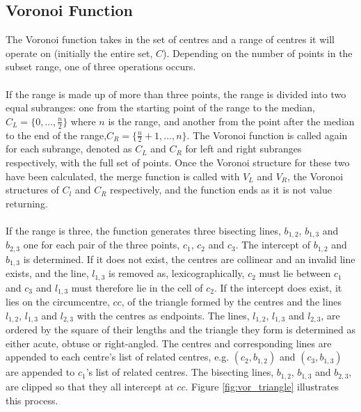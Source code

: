 \subsection{Voronoi Function}
The Voronoi function takes in the set of centres and a range of centres it will operate on (initially the entire set, $C$). Depending on the number of points in the subset range, one of three operations occurs.
\\
\\
If the range is made up of more than three points, the range is divided into two equal subranges: one from the starting point of the range to the median, $C_L = \{0,...,\frac{n}{2}\}$ where $n$ is the range, and another from the point after the median to the end of the range,$C_R = \{\frac{n}{2}+1,...,n\}$. The Voronoi function is called again for each subrange, denoted as $C_L$ and $C_R$ for left and right subranges respectively, with the full set of points. Once the Voronoi structure for these two have been calculated, the merge function is called with $V_L$ and $V_R$, the Voronoi structures of $C_l$ and $C_R$ respectively, and the function ends as it is not value returning.
\\
\\
If the range is three, the function generates three bisecting lines, $b_{1,2}$, $b_{1,3}$ and $b_{2,3}$ one for each pair of the three points, $c_1$, $c_2$ and $c_3$. The intercept of $b_{1,2}$ and $b_{1,3}$ is determined. If it does not exist, the centres are collinear and an invalid line exists, and the line, $l_{1,3}$ is removed as, lexicographically, $c_2$ must lie between $c_1$ and $c_3$ and $l_{1,3}$ must therefore lie in the cell of $c_2$. If the intercept does exist, it lies on the circumcentre, $cc$, of the triangle formed by the centres and the lines $l_{1,2}$, $l_{1,3}$ and $l_{2,3}$ with the centres as endpoints. The lines, $l_{1,2}$, $l_{1,3}$ and $l_{2,3}$, are ordered by the square of their lengths and the triangle they form is determined as either acute, obtuse or right-angled. The centres and corresponding lines are appended to each centre's list of related centres, e.g. $(c_2,b_{1,2})$ and $(c_3,b_{1,3})$ are appended to $c_1$'s list of related centres. The bisecting lines, $b_{1,2}$, $b_{1,3}$ and $b_{2,3}$, are clipped so that they all intercept at $cc$. Figure \ref{fig:vor_triangle} illustrates this process.
